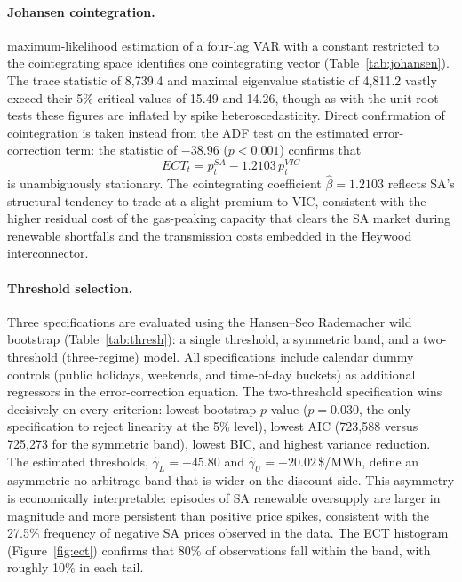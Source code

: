 \documentclass[12pt,a4paper]{article}
\newcommand{\ect}{\mathit{ECT}}
\begin{document}
\paragraph{Johansen cointegration.}
\textcite{johansen1988statistical} maximum-likelihood estimation of a four-lag VAR with a constant
restricted to the cointegrating space identifies one cointegrating vector
(Table~\ref{tab:johansen}).  The trace statistic of 8{,}739.4 and maximal
eigenvalue statistic of 4{,}811.2 vastly exceed their 5\% critical values of
15.49 and 14.26, though as with the unit root tests these figures are inflated
by spike heteroscedasticity.  Direct confirmation of cointegration is taken
instead from the ADF test on the estimated error-correction term: the statistic
of $-38.96$ ($p < 0.001$) confirms that
\begin{equation}
  \label{eq:ect}
  \ect_{t} = p_t^{SA} - 1.2103\, p_t^{VIC}
\end{equation}
is unambiguously stationary.  The cointegrating coefficient $\hat\beta = 1.2103$
reflects SA's structural tendency to trade at a slight premium to VIC,
consistent with the higher residual cost of the gas-peaking capacity that clears
the SA market during renewable shortfalls and the transmission costs embedded
in the Heywood interconnector.

\paragraph{Threshold selection.}
Three specifications are evaluated using the Hansen--Seo Rademacher wild
bootstrap (Table~\ref{tab:thresh}): a single threshold, a symmetric band, and a
two-threshold (three-regime) model.  All specifications include calendar dummy
controls (public holidays, weekends, and time-of-day buckets) as additional
regressors in the error-correction equation.  The two-threshold specification
wins decisively on every criterion: lowest bootstrap $p$-value ($p = 0.030$,
the only specification to reject linearity at the 5\% level), lowest AIC
(723{,}588 versus 725{,}273 for the symmetric band), lowest BIC, and highest
variance reduction.  The estimated thresholds, $\hat\gamma_L = -45.80$ and
$\hat\gamma_U = +20.02$\,\$/MWh, define an asymmetric no-arbitrage band that is
wider on the discount side.  This asymmetry is economically interpretable:
episodes of SA renewable oversupply are larger in magnitude and more persistent
than positive price spikes, consistent with the 27.5\% frequency of negative SA
prices observed in the data.  The ECT histogram (Figure~\ref{fig:ect}) confirms
that 80\% of observations fall within the band, with roughly 10\% in each tail.
\end{document}
